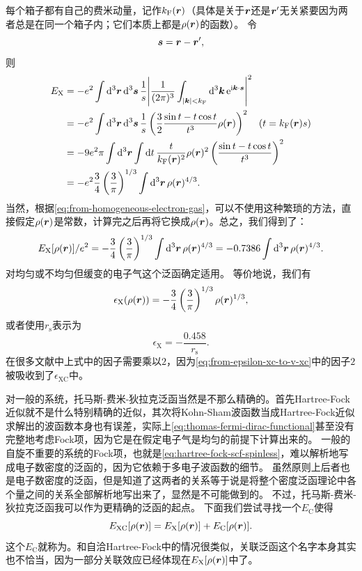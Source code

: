 每个箱子都有自己的费米动量，记作$k_\text{F}(\vb*{r})$（具体是关于$\vb*{r}$还是$\vb*{r}'$无关紧要因为两者总是在同一个箱子内；它们本质上都是$\rho(\vb*{r})$的函数）。
令
\[
    \vb*{s} = \vb*{r} - \vb*{r}', 
\]
则
\[
    \begin{aligned}
        E_\text{X} &= - e^2 \int \dd[3]{\vb*{r}} \dd[3]{\vb*{s}} \frac{1}{s} \abs{\frac{1}{(2\pi)^3} \int_{\abs{\vb*{k}} < k_\text{F}} \dd[3]{\vb*{k}} \mathrm{e}^{\mathrm{i} \vb*{k} \cdot \vb*{s}}}^2 \\
        &= - e^2 \int \dd[3]{\vb*{r}} \dd[3]{\vb*{s}} \frac{1}{s} \left( \frac{3}{2} \frac{\sin t - t \cos t}{t^3} \rho(\vb*{r}) \right)^2 \quad (t= k_\text{F}(\vb*{r}) s) \\
        &= - 9 e^2 \pi \int \dd[3]{\vb*{r}} \int \dd{t} \frac{t}{k_\text{F}(\vb*{r})^2} \rho(\vb*{r})^2 \left( \frac{\sin t - t \cos t}{t^3} \right)^2 \\
        &= - e^2 \frac{3}{4} \left( \frac{3}{\pi} \right)^{1/3} \int \dd[3]{\vb*{r}} \rho(\vb*{r})^{4/3}.
    \end{aligned}
\]
当然，根据\eqref{eq:from-homogeneous-electron-gas}，可以不使用这种繁琐的方法，直接假定$\rho(\vb*{r})$是常数，计算完之后再将它换成$\rho(\vb*{r})$。总之，我们得到了：
\begin{equation}
    E_\text{X}[\rho(\vb*{r})] / e^2 = - \frac{3}{4} \left( \frac{3}{\pi} \right)^{1/3} \int \dd[3]{\vb*{r}} \rho(\vb*{r})^{4/3} = - 0.7386 \int \dd[3]{\vb*{r}} \rho(\vb*{r})^{4/3}.
    \label{eq:thomas-fermi-dirac-functional}
\end{equation}
对均匀或不均匀但缓变的电子气这个泛函确定适用。
等价地说，我们有
\begin{equation}
    \epsilon_\text{X}(\rho(\vb*{r})) = - \frac{3}{4} \left(\frac{3}{\pi}\right)^{1/3} \rho(\vb*{r})^{1/3},
\end{equation}
或者使用$r_\text{s}$表示为
\begin{equation}
    \epsilon_\text{X} = - \frac{0.458}{r_\text{s}}.
\end{equation}
在很多文献中上式中的因子需要乘以$2$，因为\eqref{eq:from-epsilon-xc-to-v-xc}中的因子$2$被吸收到了$\epsilon_\text{XC}$中。

对一般的系统，托马斯-费米-狄拉克泛函当然是不那么精确的。首先Hartree-Fock近似就不是什么特别精确的近似，其次将Kohn-Sham波函数当成Hartree-Fock近似求解出的波函数本身也有误差，实际上\eqref{eq:thomas-fermi-dirac-functional}甚至没有完整地考虑Fock项，因为它是在假定电子气是均匀的前提下计算出来的。
一般的自旋不重要的系统的Fock项，也就是\eqref{eq:hartree-fock-scf-spinless}，难以解析地写成电子数密度的泛函的，因为它依赖于多电子波函数的细节。
虽然原则上后者也是电子数密度的泛函，但是知道了这两者的关系等于说是将整个密度泛函理论中各个量之间的关系全部解析地写出来了，显然是不可能做到的。
不过，托马斯-费米-狄拉克泛函我可以作为更精确的泛函的起点。
下面我们尝试寻找一个$E_\text{C}$使得
\begin{equation}
    E_\text{XC}[\rho(\vb*{r})] = E_\text{X}[\rho(\vb*{r})] + E_\text{C}[\rho(\vb*{r})].
\end{equation}
这个$E_\text{C}$就称为。和自洽Hartree-Fock中的情况很类似，关联泛函这个名字本身其实也不恰当，因为一部分关联效应已经体现在$E_\text{X}[\rho(\vb*{r})]$中了。

